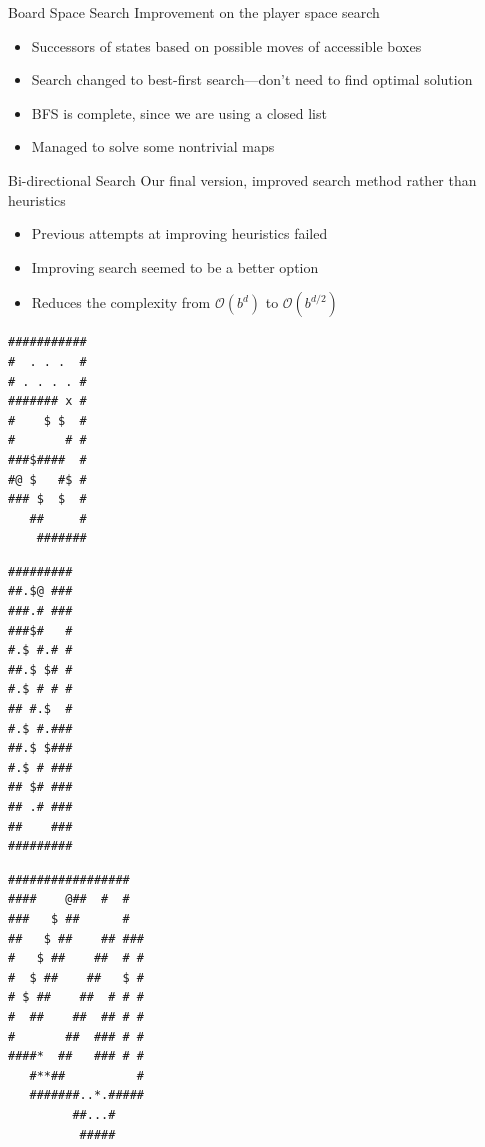 \documentclass{beamer}
\begin{document}
\begin{frame}{Board Space Search}
  Improvement on the player space search
  \begin{itemize}
  \item Successors of states based on possible moves of accessible boxes
  \item Search changed to best-first search---don't need to find optimal solution
  \item BFS is complete, since we are using a closed list
  \item Managed to solve some nontrivial maps
  \end{itemize}
\end{frame}

\begin{frame}{Bi-directional Search}
  Our final version, improved search method rather than heuristics
  \begin{itemize}
  \item Previous attempts at improving heuristics failed
  \item Improving search seemed to be a better option
  \item Reduces the complexity from $\mathcal{O}(b^d)$ to $\mathcal{O}(b^{d/2})$
  \end{itemize}
\end{frame}

\begin{lrbox}{\mapff}
  \begin{minipage}{.25\textwidth}
\centering
\begin{BVerbatim}
###########
#  . . .  #
# . . . . #
####### x #
#    $ $  #
#       # #
###$####  #
#@ $   #$ #
### $  $  #
   ##     #
    #######  
\end{BVerbatim}
  \end{minipage}
\end{lrbox}%

\begin{lrbox}{\mapss}
  \begin{minipage}{.25\textwidth}
\centering
\small{
\begin{BVerbatim}
#########
##.$@ ###
###.# ###
###$#   #
#.$ #.# #
##.$ $# #
#.$ # # #
## #.$  #
#.$ #.###
##.$ $###
#.$ # ###
## $# ###
## .# ###
##    ###
#########
\end{BVerbatim}
}
  \end{minipage}
\end{lrbox}%

\begin{lrbox}{\mapnt}
  \begin{minipage}{.25\textwidth}
\centering
\small{
\begin{BVerbatim}
#################  
####    @##  #  #  
###   $ ##      #  
##   $ ##    ## ###
#   $ ##    ##  # #
#  $ ##    ##   $ #
# $ ##    ##  # # #
#  ##    ##  ## # #
#       ##  ### # #
####*  ##   ### # #
   #**##          #
   #######..*.#####
         ##...#    
          #####
\end{BVerbatim}
}
  \end{minipage}
\end{lrbox}%
\end{document}
